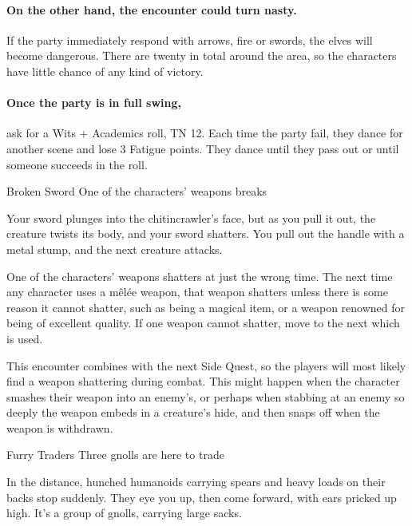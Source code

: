 \begin{multicols}{2}
\paragraph{On the other hand, the encounter could turn nasty.}
If the party immediately respond with arrows, fire or swords, the elves will become dangerous.
There are twenty in total around the area, so the characters have little chance of any kind of victory.

\paragraph{Once the party is in full swing,}
ask for a Wits + Academics roll, TN 12.
Each time the party fail, they dance for another scene and lose 3 Fatigue points.
They dance until they pass out or until someone succeeds in the roll.

{Broken Sword}%
{One of the characters' weapons breaks}%

\begin{boxtext}

	Your sword plunges into the chitincrawler's face, but as you pull it out, the creature twists its body, and your sword shatters.
	You pull out the handle with a metal stump, and the next creature attacks.

\end{boxtext}

One of the characters' weapons shatters at just the wrong time.
The next time any character uses a m\^el\'ee weapon, that weapon shatters unless there is some reason it cannot shatter, such as being a magical item, or a weapon renowned for being of excellent quality.
If one weapon cannot shatter, move to the next which is used.

This encounter combines with the next Side Quest, so the players will most likely find a weapon shattering during combat.
This might happen when the character smashes their weapon into an enemy's, or perhaps when stabbing at an enemy so deeply the weapon embeds in a creature's hide, and then snaps off when the weapon is withdrawn.

{Furry Traders}%
{Three gnolls are here to trade}%

\begin{boxtext}

	In the distance, hunched humanoids carrying spears and heavy loads on their backs stop suddenly.
	They eye you up, then come forward, with ears pricked up high.
	It's a group of gnolls, carrying large sacks.


\end{boxtext}
\end{multicols}

